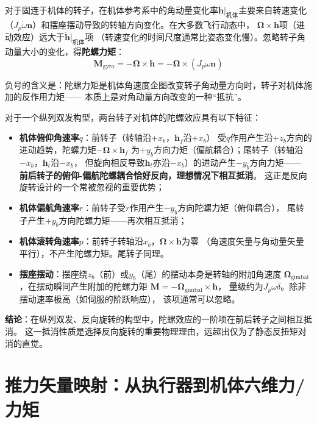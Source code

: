 \documentclass[a4paper,12pt]{ctexart}
\theoremstyle{plain}
\theoremstyle{definition}
\begin{document}
对于固连于机体的转子，在机体参考系中的角动量变化率$\dot{\bm{h}}|_{\text{机体}}$主要来自转速变化
（$J_p \dot{\omega} \bm{n}$）和摆座摆动导致的转轴方向变化。在大多数飞行动态中，
$\bm{\Omega} \times \bm{h}$项（进动效应）远大于$\dot{\bm{h}}|_{\text{机体}}$项
（转速变化的时间尺度通常比姿态变化慢）。忽略转子角动量大小的变化，得\textbf{陀螺力矩}：
\begin{equation}
    \boxed{\bm{M}_{\text{gyro}} = -\bm{\Omega} \times \bm{h}
           = -\bm{\Omega} \times (J_p \omega \bm{n})}
    \label{eq:gyro_moment}
\end{equation}

负号的含义是：陀螺力矩是机体角速度企图改变转子角动量方向时，转子对机体施加的反作用力矩——
本质上是对角动量方向改变的一种“抵抗”。

对于一个纵列双发构型，两台转子对机体的陀螺效应具有以下特征：
\begin{itemize}
    \item \textbf{机体俯仰角速率$q$}：前转子（转轴沿$+x_b$，$\bm{h}_f$沿$+x_b$）
          受$q$作用产生沿$+z_b$方向的进动趋势，陀螺力矩$-\bm{\Omega} \times \bm{h}_f$
          为$+y_b$方向力矩（偏航耦合）；尾转子（转轴沿$-x_b$，$\bm{h}_t$沿$-x_b$，
          但旋向相反导致$\bm{h}_t$亦沿$-x_b$）的进动产生$-y_b$方向力矩——
          \textbf{前后转子的俯仰-偏航陀螺耦合恰好反向，理想情况下相互抵消}。
          这正是反向旋转设计的一个常被忽视的重要优势；
    \item \textbf{机体偏航角速率$r$}：前转子受$r$作用产生$-y_b$方向陀螺力矩（俯仰耦合），
          尾转子产生$+y_b$方向陀螺力矩——再次相互抵消；
    \item \textbf{机体滚转角速率$p$}：前转子转轴沿$x_b$，$\bm{\Omega} \times \bm{h}$为零
          （角速度矢量与角动量矢量平行），不产生陀螺力矩。尾转子同理。
    \item \textbf{摆座摆动}：摆座绕$z_b$（前）或$y_b$（尾）的摆动本身是转轴的附加角速度
          $\bm{\Omega}_{\text{gimbal}}$，在摆动瞬间产生附加的陀螺力矩
          $\bm{M} = -\bm{\Omega}_{\text{gimbal}} \times \bm{h}$，
          量级约为$J_p \omega \dot{\delta}$。除非摆动速率极高（如伺服的阶跃响应），
          该项通常可以忽略。
\end{itemize}

\textbf{结论}：在纵列双发、反向旋转的构型中，陀螺效应的一阶项在前后转子之间相互抵消。
这一抵消性质是选择反向旋转的重要物理理由，远超出仅为了静态反扭矩对消的直觉。

\section{推力矢量映射：从执行器到机体六维力/力矩}
\label{sec:mapping}
\end{document}
